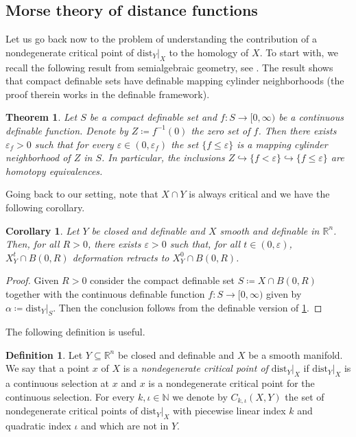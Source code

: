 \documentclass{amsart}
\newcommand{\R}{\mathbb{R}}
\newcommand{\dd}{\mathrm{dist}}
\newcommand{\N}{\mathbb{N}}
\newcommand{\dist}{{\mathrm{dist}_Y|_X}}
\def\lini{k}
\def\quadi{\iota}
\newtheorem{theorem}[subsubsection]{Theorem}
\newtheorem{corollary}[subsubsection]{Corollary}
\theoremstyle{definition}
\newtheorem{definition}[subsubsection]{Definition}
\theoremstyle{remark}
\begin{document}
\subsection{Morse theory of distance functions}

Let us go back now to the problem of understanding the contribution of a nondegenerate critical point of $\dist$ to the homology of $X$. To start with, we recall the following result from semialgebraic geometry, see \cite[Theorem 1.42]{lecturenotesantonio}. 
The result shows that compact definable sets have definable mapping cylinder neighborhoods (the proof therein works in the definable framework).

\begin{theorem}
\label{thm:mappingcylinder}
Let $S$ be a compact definable set and $f \colon S \to [0, \infty)$ be a continuous definable function. Denote by $Z \coloneqq f^{-1}(0)$ the zero set of $f$. Then there exists $\varepsilon_f > 0$ such that for every $\varepsilon \in (0, \varepsilon_f)$ the set $\{f \leq \varepsilon\}$ is a mapping cylinder neighborhood of $Z$ in $S$. In particular, the inclusions $Z\hookrightarrow \{f < \varepsilon\} \hookrightarrow \{f \leq \varepsilon\}$ are homotopy equivalences.
\end{theorem}

Going back to our setting, note that $X\cap Y$ is always critical and we have the following corollary.

\begin{corollary}
Let $Y$ be closed and definable and $X$ smooth and definable in $\R^n$. Then, for all $R > 0$, there exists $\varepsilon > 0$ such that, for all $t \in (0, \varepsilon)$, $X_Y^t \cap B(0, R)$ deformation retracts to $X_Y^0 \cap B(0, R)$.
\end{corollary}

\begin{proof}
Given $R>0$ consider the compact definable set $S \coloneqq X \cap B(0, R)$  together with the continuous definable function $f \colon S \to [0, \infty)$ given by $\alpha \coloneqq \dd_Y|_S.$ Then the conclusion follows from the definable version of \cref{thm:mappingcylinder}.
\end{proof}

The following definition is useful.

\begin{definition}\label{def:setnondegcritpts} Let $Y\subseteq \R^n$ be closed and definable and $X$ be a smooth manifold. We say that a point $x$ of $X$ is a \emph{nondegenerate critical point of $\dist$} if $\dist$ is a continuous selection at $x$ and $x$ is a nondegenerate critical point for the continuous selection. For every $\lini, \quadi \in \N$ we denote by $C_{\lini, \quadi}(X,Y)$ the set of nondegenerate critical points of $\dist$ with piecewise linear index $\lini$ and quadratic index $\quadi$ and which are not in $Y$.
\end{definition}
\end{document}
